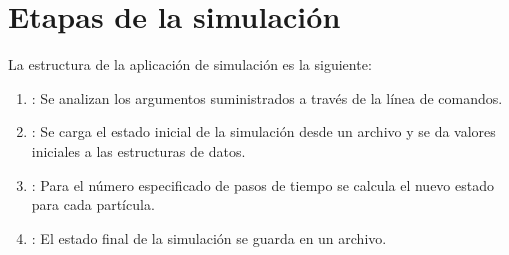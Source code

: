 \section{Etapas de la simulación}

La estructura de la aplicación de simulación es la siguiente:

\begin{enumerate}
  \item {}: Se analizan los argumentos 
        suministrados a través de la línea de comandos.
  \item {}: Se carga el estado inicial de la
        simulación desde un archivo y se da valores iniciales a las estructuras
        de datos.
  \item {}: Para el número especificado
        de pasos de tiempo se calcula el nuevo estado para cada partícula.
  \item {}: El estado final de la
        simulación se guarda en un archivo.
\end{enumerate}





